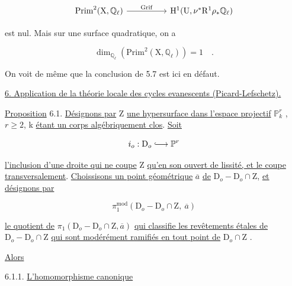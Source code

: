 \begin{equation*}
\begin{tikzcd}[column sep=huge]
\mathrm{Prim}^2(\mathrm{X},\mathbb{Q}_\ell) \arrow[r, "\mathrm{Grif}"] & \mathrm{H}^1(\mathrm{U},\nu^*\mathrm{R}^1\rho_*\mathbb{Q}_\ell)
\end{tikzcd}
\end{equation*}

est nul. Mais sur une surface quadratique, on a

\begin{equation*}
\dim_{\mathbb{Q}_\ell} \left( \mathrm{Prim}^2(\mathrm{X},\mathbb{Q}_\ell) \right) = 1 \quad .
\end{equation*}

On voit de même que la conclusion de 5.7 est ici en défaut.

\underline{6. Application de la théorie locale des cycles evanescents (Picard-Lefschetz).}

\underline{Proposition} 6.1. \underline{Désignons par} Z \underline{une hypersurface dans l'espace projectif} $\mathbb{P}^r_k$ , $r \geq 2$, k \underline{étant un corps algébriquement clos}. \underline{Soit}

\begin{equation*}
i_o : \mathrm{D}_o \lhook\joinrel\longrightarrow \mathbb{P}^r
\end{equation*}

\underline{l'inclusion d'une droite qui ne coupe} Z \underline{qu'en son ouvert de lissité, et le coupe transversalement}. \underline{Choissisons un point géométrique} $\overline{a}$ \underline{de} $\mathrm{D}_o - \mathrm{D}_o \cap \mathrm{Z}$, \underline{et désignons par}

\begin{equation*}
\pi_1^{\mathrm{mod}}(\mathrm{D}_o - \mathrm{D}_o \cap \mathrm{Z}, \ \overline{a})
\end{equation*}

\underline{le quotient de} $\pi_1(\mathrm{D}_o - \mathrm{D}_o \cap \mathrm{Z}, \overline{a})$ \underline{qui classifie les revêtements étales de} $\mathrm{D}_o - \mathrm{D}_o \cap \mathrm{Z}$ \underline{qui sont modérément ramifiés en tout point de} $\mathrm{D}_o \cap \mathrm{Z}$ .

\underline{Alors}



%
%
6.1.1. \underline{L'homomorphisme canonique}

